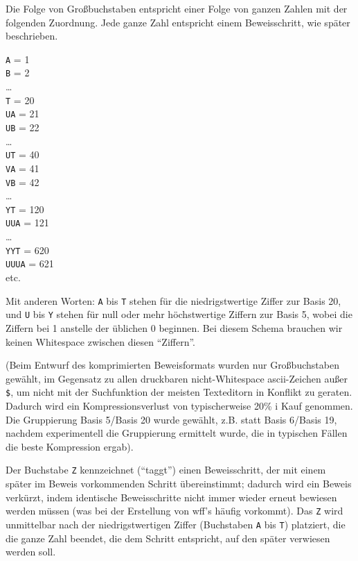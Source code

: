 Die Folge von Großbuchstaben entspricht einer Folge von ganzen Zahlen mit der folgenden Zuordnung.  Jede ganze Zahl entspricht einem Beweisschritt, wie später beschrieben. 
\begin{center}
  \texttt{A} = 1 \\
  \texttt{B} = 2 \\
   \ldots \\
  \texttt{T} = 20 \\
  \texttt{UA} = 21 \\
  \texttt{UB} = 22 \\
   \ldots \\
  \texttt{UT} = 40 \\
  \texttt{VA} = 41 \\
  \texttt{VB} = 42 \\
   \ldots \\
  \texttt{YT} = 120 \\
  \texttt{UUA} = 121 \\
   \ldots \\
  \texttt{YYT} = 620 \\
  \texttt{UUUA} = 621 \\
   etc.
\end{center}

Mit anderen Worten: \texttt{A} bis \texttt{T} stehen für die niedrigstwertige Ziffer zur Basis 20, und \texttt{U} bis \texttt{Y} stehen für null oder mehr höchstwertige Ziffern zur Basis 5, wobei die Ziffern bei 1 anstelle der üblichen 0 beginnen. Bei diesem Schema brauchen wir keinen Whitespace zwischen diesen "`Ziffern"'. 

(Beim Entwurf des komprimierten Beweisformats wurden nur Großbuchstaben gewählt, im Gegensatz zu allen druckbaren nicht-Whitespace {\sc ascii}-Zeichen außer
\texttt{\$}, um nicht mit der Suchfunktion der meisten Texteditorn in Konflikt zu geraten. Dadurch wird ein Kompressionsverlust von typischerweise 20\% i Kauf genommen.  Die Gruppierung Basis 5/Basis 20 wurde gewählt, z.B. statt Basis 6/Basis 19, nachdem experimentell die Gruppierung ermittelt wurde, die in typischen Fällen die beste Kompression ergab). 

Der Buchstabe \texttt{Z} kennzeichnet ("`taggt"') einen Beweisschritt, der mit einem später im Beweis vorkommenden Schritt übereinstimmt; dadurch wird ein Beweis verkürzt, indem identische Beweisschritte nicht immer wieder erneut bewiesen werden müssen (was bei der Erstellung von wff's häufig vorkommt).  Das \texttt{Z} wird unmittelbar nach der niedrigstwertigen Ziffer (Buchstaben \texttt{A} bis \texttt{T}) platziert, die die ganze Zahl beendet, die dem Schritt entspricht, auf den später verwiesen werden soll. 

